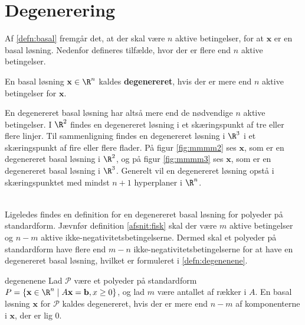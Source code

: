 \section{Degenerering}
Af \ref{defn:basal} fremgår det, at der skal være $n$ aktive betingelser, for at $\mathbf{x}$ er en basal løsning. 
Nedenfor defineres tilfælde, hvor der er flere end $n$ aktive betingelser. 
%
\begin{defn}{}{}
En basal løsning $\mathbf{x} \in \R^n$ kaldes \textbf{degenereret}, hvis der er mere end $n$ aktive betingelser for $\mathbf{x}$.
\end{defn}
\noindent
%
En degenereret basal løsning har altså mere end de nødvendige $n$ aktive betingelser.
% 
I $\R^2$ findes en degenereret løsning i et skæringspunkt af tre eller flere linjer. 
Til sammenligning findes en degenereret løsning i $\R^3$ i et skæringspunkt af fire eller flere flader. 
På figur \ref{fig:mmmm2} ses $\mathbf{x}$, som er en degenereret basal løsning i $\R^2$, og på figur  \ref{fig:mmmm3} ses $\mathbf{x}$, som er en degenereret basal løsning i $\R^3$.
Generelt vil en degenereret løsning opstå i skæringspunktet med mindst $n+1$ hyperplaner i $\R^n$.
%
%
\begin{center}
$
\begin{array}{cc}
&

\end{array}
$
\end{center}
%
%
Ligeledes findes en definition for en degenereret basal løsning for polyeder på standardform. 
Jævnfør definition \ref{afsnit:fisk} skal der være $m$ aktive betingelser og $n-m$ aktive ikke-negativitetsbetingelserne. 
Dermed skal et polyeder på standardform have flere end $m-n$ ikke-negativitetsbetingelserne for at have en degenereret basal løsning, hvilket er formuleret i \ref{defn:degenenene}. 
%
\begin{defn}{}{degenenene}
Lad $\mathcal{P}$ være et polyeder på standardform
$P=\{ \mathbf{x} \in \R^n \mid A \mathbf{x}=\mathbf{b},x \geq 0 \}$, og lad $m$ være antallet af rækker i $A$.
En basal løsning $\mathbf{x}$ for $\mathcal{P}$ kaldes degenereret, hvis der er mere end $n-m$ af komponenterne i $\mathbf{x}$, der er lig $0$.
\end{defn}
%
